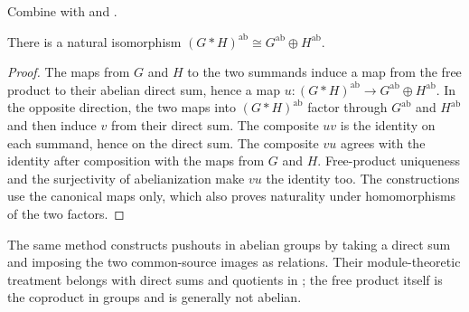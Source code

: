 Combine  with
 and
.

\begin{theorem}\label{free-product-abelianization}
There is a natural isomorphism
$(G*H)^{\mathrm{ab}}\cong G^{\mathrm{ab}}\oplus H^{\mathrm{ab}}$.
\end{theorem}
\begin{proof}\label{free-product-abelianization-proof}
The maps from $G$ and $H$ to the two summands induce a map from the
free product to their abelian direct sum, hence a map
$u:(G*H)^{\mathrm{ab}}\to G^{\mathrm{ab}}\oplus H^{\mathrm{ab}}$.
In the opposite direction, the two maps into $(G*H)^{\mathrm{ab}}$
factor through $G^{\mathrm{ab}}$ and $H^{\mathrm{ab}}$ and then induce
$v$ from their direct sum. The composite $uv$ is the identity on
each summand, hence on the direct sum. The composite $vu$ agrees
with the identity after composition with the maps from $G$ and $H$.
Free-product uniqueness and the surjectivity of abelianization make
$vu$ the identity too. The constructions use the canonical maps only,
which also proves naturality under homomorphisms of the two factors.
\end{proof}
\begin{remark}\label{abelian-pushout-link}
The same method constructs pushouts in abelian groups by taking a
direct sum and imposing the two common-source images as relations.
Their module-theoretic treatment belongs with direct sums and quotients
in ; the free product itself is the
coproduct in groups and is generally not abelian.
\end{remark}
